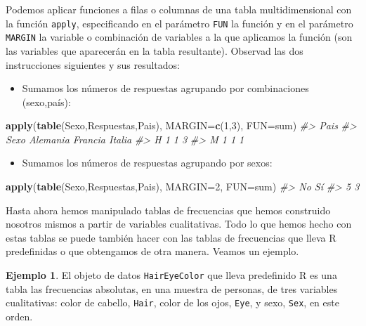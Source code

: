 \documentclass[
]{book}
\newenvironment{Shaded}{\begin{snugshade}}{\end{snugshade}}
\newcommand{\CommentTok}[1]{\textcolor[rgb]{0.56,0.35,0.01}{\textit{#1}}}
\newcommand{\DataTypeTok}[1]{\textcolor[rgb]{0.13,0.29,0.53}{#1}}
\newcommand{\DecValTok}[1]{\textcolor[rgb]{0.00,0.00,0.81}{#1}}
\newcommand{\KeywordTok}[1]{\textcolor[rgb]{0.13,0.29,0.53}{\textbf{#1}}}
\newcommand{\NormalTok}[1]{#1}
\providecommand{\tightlist}{%
  \setlength{\itemsep}{0pt}\setlength{\parskip}{0pt}}
\theoremstyle{definition}
\theoremstyle{definition}
\newtheorem{example}{Ejemplo}[chapter]
\theoremstyle{definition}
\theoremstyle{remark}
\begin{document}
Podemos aplicar funciones a filas o columnas de una tabla multidimensional con la función \texttt{apply}, especificando en el parámetro \texttt{FUN} la función y en el parámetro \texttt{MARGIN} la variable o combinación de variables a la que aplicamos la función (son las variables que aparecerán en la tabla resultante). Observad las dos instrucciones siguientes y sus resultados:

\begin{itemize}
\tightlist
\item
  Sumamos los números de respuestas agrupando por combinaciones (sexo,país):
\end{itemize}

\begin{Shaded}
\begin{Highlighting}[]
\KeywordTok{apply}\NormalTok{(}\KeywordTok{table}\NormalTok{(Sexo,Respuestas,Pais), }\DataTypeTok{MARGIN=}\KeywordTok{c}\NormalTok{(}\DecValTok{1}\NormalTok{,}\DecValTok{3}\NormalTok{), }\DataTypeTok{FUN=}\NormalTok{sum)}
\CommentTok{\#\textgreater{}     Pais}
\CommentTok{\#\textgreater{} Sexo Alemania Francia Italia}
\CommentTok{\#\textgreater{}    H        1       1      3}
\CommentTok{\#\textgreater{}    M        1       1      1}
\end{Highlighting}
\end{Shaded}

\begin{itemize}
\tightlist
\item
  Sumamos los números de respuestas agrupando por sexos:
\end{itemize}

\begin{Shaded}
\begin{Highlighting}[]
\KeywordTok{apply}\NormalTok{(}\KeywordTok{table}\NormalTok{(Sexo,Respuestas,Pais), }\DataTypeTok{MARGIN=}\DecValTok{2}\NormalTok{, }\DataTypeTok{FUN=}\NormalTok{sum)}
\CommentTok{\#\textgreater{} No Sí }
\CommentTok{\#\textgreater{}  5  3}
\end{Highlighting}
\end{Shaded}

Hasta ahora hemos manipulado tablas de frecuencias que hemos construido nosotros mismos a partir de variables cualitativas. Todo lo que hemos hecho con estas tablas se puede también hacer con las tablas de frecuencias que lleva R predefinidas o que obtengamos de otra manera. Veamos un ejemplo.

\begin{example}
\protect\hypertarget{exm:HairEyeColor}{}{\label{exm:HairEyeColor} }El objeto de datos \texttt{HairEyeColor} que lleva predefinido R es una tabla las frecuencias absolutas, en una muestra de personas, de tres variables cualitativas: color de cabello, \texttt{Hair}, color de los ojos, \texttt{Eye}, y sexo, \texttt{Sex}, en este orden.
\end{example}
\end{document}
